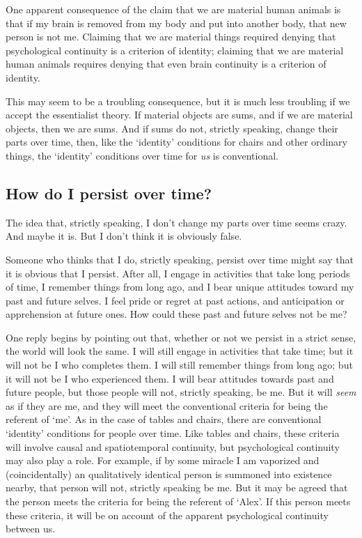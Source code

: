 \documentclass[11pt]{article}
\begin{document}
\begin{spacing}{1.5}
One apparent consequence of the claim that we are material human
animals is that if my brain is removed from my body and put into
another body, that new person is not me.  Claiming that we are
material things required denying that psychological continuity is a
criterion of identity; claiming that we are material human animals
requires denying that even brain continuity is a criterion of
identity.

This may seem to be a troubling consequence, but it is much less
troubling if we accept the essentialist theory.  If material objects
are sums, and if we are material objects, then we are sums.  And if
sums do not, strictly speaking, change their parts over time, then,
like the `identity' conditions for chairs and other ordinary things,
the `identity' conditions over time for {\em us} is conventional.



\subsection{How do I persist over time?}
\label{person-persist}
The idea that, strictly speaking, I don't change my parts over time
seems crazy.  And maybe it is.  But I don't think it is obviously
false.

Someone who thinks that I do, strictly speaking, persist over time
might say that it is obvious that I persist.  After all, I engage in
activities that take long periods of time, I remember things from long
ago, and I bear unique attitudes toward my past and future selves.  I
feel pride or regret at past actions, and anticipation or apprehension
at future ones.  How could these past and future selves not be me?

One reply begins by pointing out that, whether or not we persist in a
strict sense, the world will look the same.  I will still engage in
activities that take time; but it will not be I who completes them.  I
will still remember things from long ago; but it will not be I who
experienced them.  I will bear attitudes towards past and future
people, but those people will not, strictly speaking, be me.  But it
will {\em seem} as if they are me, and they will meet the conventional
criteria for being the referent of `me'.  As in the case of tables and
chairs, there are conventional `identity' conditions for people over
time.  Like tables and chairs, these criteria will involve causal and
spatiotemporal continuity, but psychological continuity may also play
a role.  For example, if by some miracle I am vaporized and
(coincidentally) an qualitatively identical person is summoned into
existence nearby, that person will not, strictly speaking be me.  But
it may be agreed that the person meets the criteria for being the
referent of `Alex'.  If this person meets these criteria, it will be
on account of the apparent psychological continuity between us.


\end{spacing}
\end{document}
